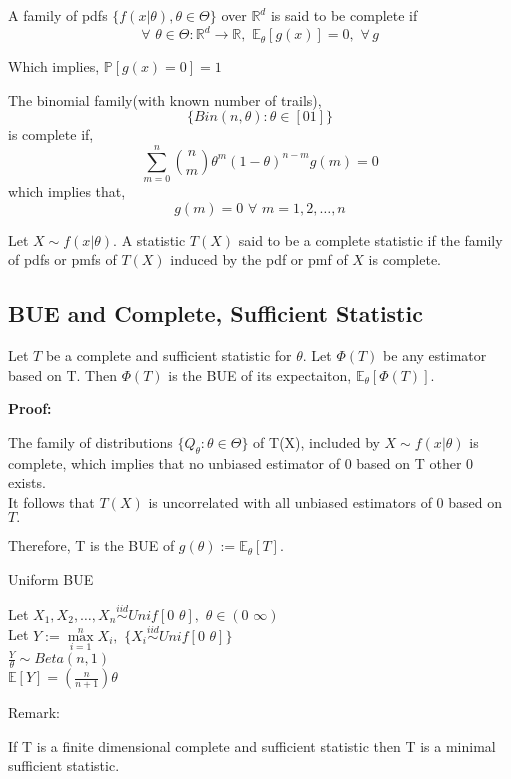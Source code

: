 \documentclass[a4paper,english,12pt]{article}
\begin{document}
\begin{defn}
A family of pdfs $\{f(x|\theta),\theta \in \Theta \}$ over $\mathbb{R}^d$ is said to be complete if
$$\forall\,\, \theta\in \Theta : \mathbb{R}^d\rightarrow \mathbb{R}, \,\, \mathbb{E}_\theta[g(x)]=0, \,\, \forall\, g$$
\end{defn}
\begin{center}
Which implies,  $\mathbb{P}[g(x)=0]=1$ 
\end{center} 
\begin{exmp}

The binomial family(with known number of trails),
$$\{Bin(n,\theta): \theta\in[0 1]\}$$ is complete if, $$\sum \limits_{m=0}^n {n \choose m}\theta^m(1-\theta)^{n-m} g(m)=0 $$
which implies that, $$g(m)=0\,\, \forall \,\, m=1,2,\dots,n$$
\end{exmp}
\begin{defn}
Let $X \sim f(x|\theta)$. A statistic $T(X)$ said to be a complete statistic if the family of pdfs or pmfs of $T(X)$ induced by the pdf or pmf of $X$ is complete. 
\end{defn}
\subsection{BUE and Complete, Sufficient Statistic}
\begin{thm}
Let $T$ be a complete and sufficient statistic for $\theta.$ Let $\Phi(T)$ be any estimator based on T. Then $\Phi(T)$ is the BUE of its expectaiton, $\mathbb{E}_\theta[\Phi(T)].$
\end{thm}
\begin{flushleft}
\textbf{Proof:}
\end{flushleft}
The family of distributions $ \{ Q_ \theta: \theta \in \Theta \}$ of T(X), included by $X \sim f(x| \theta)$ is complete, which implies that no unbiased estimator of 0 based on T other 0 exists.\\
It follows that $T(X)$ is uncorrelated with all unbiased estimators of 0 based on $T.$
\begin{center}
Therefore, T is the BUE of $g(\theta):=\mathbb{E}_\theta[T].$ 
\end{center}
\begin{exmp} Uniform BUE
\begin{center}
Let $X_1,X_2,\dots,X_n \overset{iid}{\sim} Unif[0 \,\,\theta], \,\, \theta\in(0\,\, \infty)$\\
Let $Y:=\max\limits_{i=1}^n X_i, \,\, \{X_i\overset{iid}{\sim}Unif[0\,\,\theta]\} $\\ 
\hfill \break
$\displaystyle{ \frac{Y}{\theta} \sim Beta(n,1)}$\\
\hfill \break
$\mathbb{E}[Y]=(\frac{n}{n+1}) \theta $
\end{center}
\end{exmp}
Remark:\\
\begin{rem}
If T is a finite dimensional complete and sufficient statistic then T is a minimal sufficient statistic. 
\end{rem}
\end{document}

